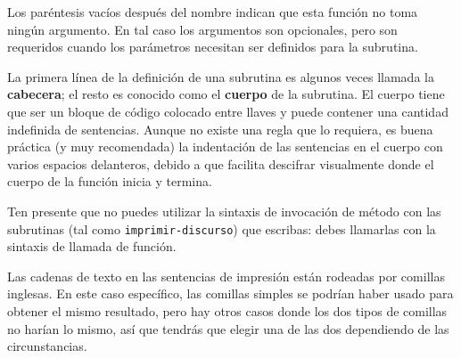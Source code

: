 Los paréntesis vacíos después del nombre indican que esta función 
no toma ningún argumento. En tal caso los argumentos son opcionales,
pero son requeridos cuando los parámetros necesitan ser definidos para
la subrutina.

La primera línea de la definición de una subrutina es algunos
veces llamada la {\bf cabecera}; el resto es conocido como el
{\bf cuerpo} de la subrutina. El cuerpo tiene que ser un bloque de
código colocado entre llaves y puede contener una cantidad
indefinida de sentencias. Aunque no existe una regla que lo requiera,
es buena práctica (y muy recomendada) la indentación de las sentencias
en el cuerpo con varios espacios delanteros, debido a que facilita
descifrar visualmente donde el cuerpo de la función inicia y termina.

Ten presente que no puedes utilizar la sintaxis de invocación de método
con las subrutinas (tal como \verb|imprimir-discurso|) que escribas: 
debes llamarlas con la sintaxis de llamada de función.

Las cadenas de texto en las sentencias de impresión están rodeadas
por comillas inglesas. En este caso específico, las comillas simples
se podrían haber usado para obtener el mismo resultado, pero
hay otros casos donde los dos tipos de comillas no harían lo mismo,
así que tendrás que elegir una de las dos dependiendo de las 
circunstancias.

